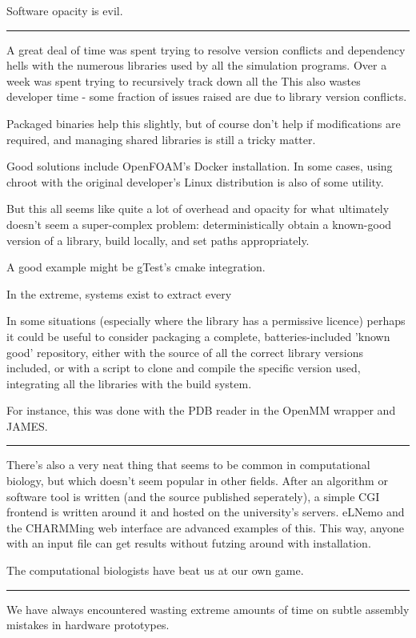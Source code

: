 \documentclass[paper.tex]{subfiles}
\begin{document}
Software opacity is evil.

\rule{\linewidth}{0.2pt}

A great deal of time was spent trying to resolve version conflicts and dependency hells with the numerous libraries used by all the simulation programs. Over a week was spent trying to recursively track down all the This also wastes developer time - some fraction of issues raised are due to library version conflicts. 

Packaged binaries help this slightly, but of course don't help if modifications are required, and managing shared libraries is still a tricky matter.

Good solutions include OpenFOAM's Docker installation. In some cases, using chroot with the original developer's Linux distribution is also of some utility.

But this all seems like quite a lot of overhead and opacity for what ultimately doesn't seem a super-complex problem: deterministically obtain a known-good version of a library, build locally, and set paths appropriately.

A good example might be gTest's cmake integration.

In the extreme, systems exist to extract every 

In some situations (especially where the library has a permissive licence) perhaps it could be useful to consider packaging a complete, batteries-included 'known good' repository, either with the source of all the correct library versions included, or with a script to clone and compile the specific version used, integrating all the libraries with the build system. 

For instance, this was done with the PDB reader in the OpenMM wrapper and JAMES.

\rule{\linewidth}{0.2pt}

There's also a very neat thing that seems to be common in computational biology, but which doesn't seem popular in other fields. After an algorithm or software tool is written (and the source published seperately), a simple CGI frontend is written around it and hosted on the university's servers. eLNemo and the CHARMMing web interface are advanced examples of this. This way, anyone with an input file can get results without futzing around with installation. 

The computational biologists have beat us at our own game.

\rule{\linewidth}{0.2pt}

We have always encountered wasting extreme amounts of time on subtle assembly mistakes in hardware prototypes. 
\end{document}
